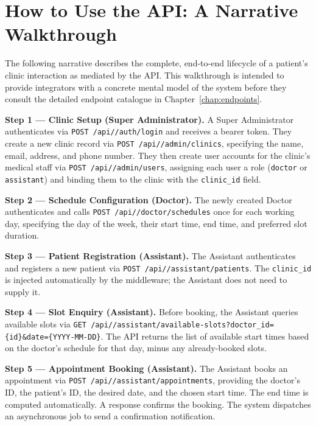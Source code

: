 \section{How to Use the API: A Narrative Walkthrough}
\label{sec:walkthrough}

The following narrative describes the complete, end-to-end lifecycle of
a patient's clinic interaction as mediated by the API. This walkthrough
is intended to provide integrators with a concrete mental model of the
system before they consult the detailed endpoint catalogue in
Chapter~\ref{chap:endpoints}.

\textbf{Step 1 --- Clinic Setup (Super Administrator).}
A Super Administrator authenticates via
\texttt{POST /api/\apiversion{}/auth/login} and receives a bearer token.
They create a new clinic record via
\texttt{POST /api/\apiversion{}/admin/clinics}, specifying the name,
email, address, and phone number. They then create user accounts for the
clinic's medical staff via \texttt{POST /api/\apiversion{}/admin/users},
assigning each user a role (\texttt{doctor} or \texttt{assistant}) and
binding them to the clinic with the \texttt{clinic\_id} field.

\textbf{Step 2 --- Schedule Configuration (Doctor).}
The newly created Doctor authenticates and calls
\texttt{POST /api/\apiversion{}/doctor/schedules} once for each working
day, specifying the day of the week, their start time, end time, and
preferred slot duration.

\textbf{Step 3 --- Patient Registration (Assistant).}
The Assistant authenticates and registers a new patient via
\texttt{POST /api/\apiversion{}/assistant/patients}. The
\texttt{clinic\_id} is injected automatically by the middleware; the
Assistant does not need to supply it.

\textbf{Step 4 --- Slot Enquiry (Assistant).}
Before booking, the Assistant queries available slots via
\texttt{GET /api/\apiversion{}/assistant/available-slots?doctor\_id=\{id\}\&date=\{YYYY-MM-DD\}}.
The API returns the list of available start times based on the doctor's
schedule for that day, minus any already-booked slots.

\textbf{Step 5 --- Appointment Booking (Assistant).}
The Assistant books an appointment via
\texttt{POST /api/\apiversion{}/assistant/appointments}, providing the
doctor's ID, the patient's ID, the desired date, and the chosen start
time. The end time is computed automatically. A \stcreated{} response
confirms the booking. The system dispatches an asynchronous job to send
a confirmation notification.

